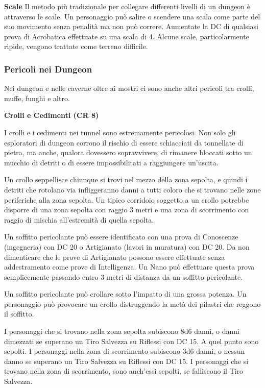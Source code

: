 \documentclass[a4paper,11pt,twoside,openany]{book}
\begin{document}
{\textbf{Scale} Il metodo più tradizionale per collegare differenti livelli di un dungeon è attraverso le scale. Un personaggio può salire o scendere una scala come parte del suo movimento senza penalità ma non può correre. Aumentate la DC di qualsiasi prova di Acrobatica effettuate su una scala di 4. Alcune scale, particolarmente ripide, vengono trattate come terreno difficile.

\subsubsection{Pericoli nei Dungeon}

Nei dungeon e nelle caverne oltre ai mostri ci sono anche altri pericoli tra crolli, muffe, funghi e altro.

\textbf{Crolli e Cedimenti (CR 8)}

I crolli e i cedimenti nei tunnel sono estremamente pericolosi. Non solo gli esploratori di dungeon corrono il rischio di essere schiacciati da tonnellate di pietra, ma anche, qualora dovessero sopravvivere, di rimanere bloccati sotto un mucchio di detriti o di essere impossibilitati a raggiungere un'uscita.

Un crollo seppellisce chiunque si trovi nel mezzo della zona sepolta, e quindi i detriti che rotolano via infliggeranno danni a tutti coloro che si trovano nelle zone periferiche alla zona sepolta. Un tipico corridoio soggetto a un crollo potrebbe disporre di una zona sepolta con raggio 3 metri e una zona di scorrimento con raggio di mischia all'estremità di quella sepolta.

Un soffitto pericolante può essere identificato con una prova di Conoscenze (ingegneria) con DC 20 o Artigianato (lavori in muratura) con DC 20. Da non dimenticare che le prove di Artigianato possono essere effettuate senza addestramento come prove di Intelligenza. Un Nano può effettuare questa prova semplicemente passando entro 3 metri di distanza da un soffitto pericolante. 

Un soffitto pericolante può crollare sotto l'impatto di una grossa potenza. Un personaggio può provocare un crollo distruggendo la metà dei pilastri che reggono il soffitto.

I personaggi che si trovano nella zona sepolta subiscono 8d6 danni, o danni dimezzati se superano un Tiro Salvezza su Riflessi con DC 15. A quel punto sono sepolti. I personaggi nella zona di scorrimento subiscono 3d6 danni, o nessun danno se superano un Tiro Salvezza su Riflessi con DC 15. I personaggi che si trovano nella zona di scorrimento, sono anch'essi sepolti, se falliscono il Tiro Salvezza.

}
\end{document}
